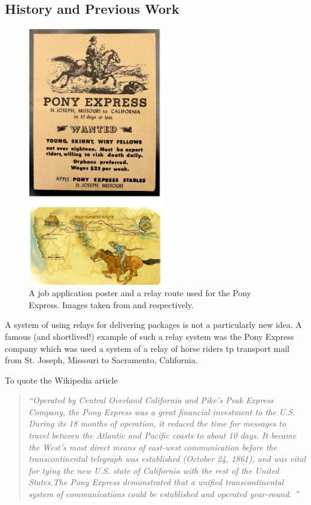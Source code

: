 \documentclass[10pt, english, oneside]{report}
\begin{document}
\nocite{*}
\printbibliography
\begin{appendices}

\chapter{History and Previous Work}
\begin{figure}
  \begin{center}
      \includegraphics[width=6cm]{docs/pony-express.png}
      \caption{A job application poster and a relay route used for the Pony Express. 
      Images taken from \cite{orphans} and \cite{ponyroute} respectively.}
  \end{center}
\end{figure}

A system of using relays for delivering packages is not a particularly new idea. A 
famous (and shortlived!) example of such a relay system was the Pony Express company which 
was used a system of a relay of horse riders tp transport mail from St. Joseph, Missouri to 
Sacramento, California. 

To quote the Wikipedia article

\begin{quote}
\textit{``Operated by Central Overland California and Pike's Peak Express Company, the Pony Express was a great 
financial investment to the U.S. During its 18 months of operation, it reduced the time for messages to travel 
between the Atlantic and Pacific coasts to about 10 days. It became the West's most direct means of east-west 
communication before the transcontinental telegraph was established (October 24, 1861), and was vital for tying 
the new U.S. state of California with the rest of the United States.The Pony Express demonstrated that a unified 
transcontinental system of communications could be established and operated year-round. ''}
\end{quote}



\end{appendices}
\end{document}
